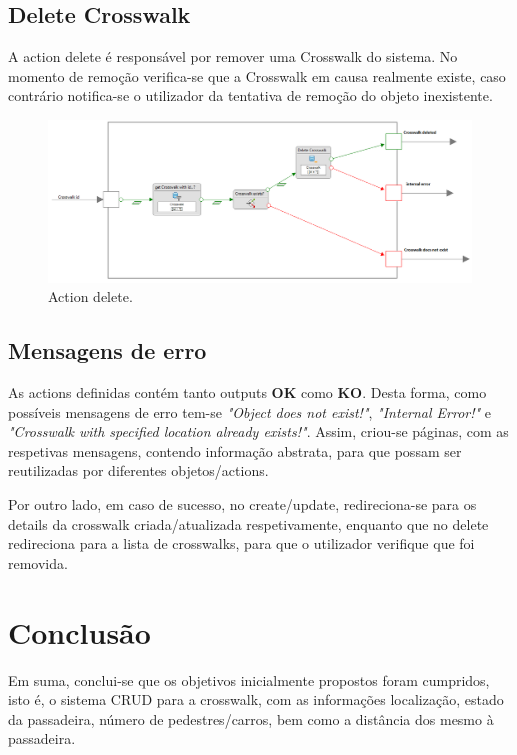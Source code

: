\documentclass[11pt,a4paper]{report}%
\begin{document}
\subsection{Delete Crosswalk}

\hspace{5mm} A action delete é responsável por remover uma Crosswalk do sistema. No momento de remoção verifica-se que a Crosswalk em causa realmente existe, caso contrário notifica-se o utilizador da tentativa de remoção do objeto inexistente. 

\begin{figure}[H]
    \centering
    \includegraphics[scale=0.55]{delete.PNG}
    \caption{Action delete.}
    \label{fig:mod_dom}
\end{figure}
    
\subsection{Mensagens de erro}
\hspace{5mm} As actions definidas contém tanto outputs \textbf{OK} como \textbf{KO}. Desta forma, como possíveis mensagens de erro tem-se \textit{"Object does not exist!"}, \textit{"Internal Error!"} e \textit{"Crosswalk with specified location already exists!"}. Assim, criou-se páginas, com as respetivas mensagens, contendo informação abstrata, para que possam ser reutilizadas por diferentes objetos/actions. 

\hspace{5mm} Por outro lado, em caso de sucesso, no create/update, redireciona-se para os details da crosswalk criada/atualizada respetivamente, enquanto que no delete redireciona para a lista de crosswalks, para que o utilizador verifique que foi removida.

\section{Conclusão}
\hspace{5mm} Em suma, conclui-se que os objetivos inicialmente propostos foram cumpridos, isto é, o sistema CRUD para a crosswalk, com as informações localização, estado da passadeira, número de pedestres/carros, bem como a distância dos mesmo à passadeira.
\end{document}
